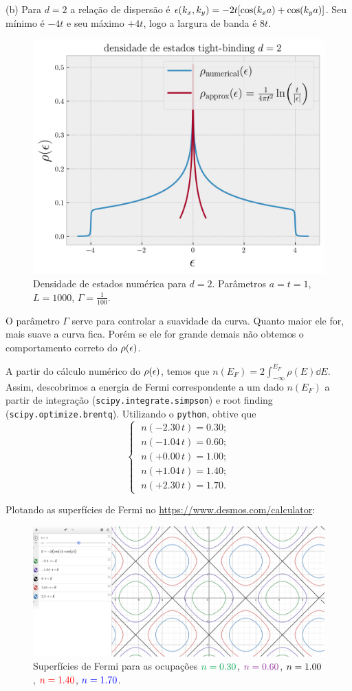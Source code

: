 \documentclass[a4paper,10pt]{article}
\begin{document}
(b) Para $d = 2$ a relação de dispersão é $\epsilon(k_x, k_y) = -2t [\cos(k_x a) + \cos(k_y a)]$. Seu mínimo é $-4t$ e seu máximo $+4t$, logo a largura de banda é $8t$.
\begin{figure}[H]
\centering
\includegraphics[width=0.7\linewidth]{fig/num_dos.png}
\caption{Densidade de estados numérica para $d = 2$. Parâmetros $a = t = 1$, $L = 1000$, $\Gamma = \frac{1}{100}$.}
\label{fig:num_dos}
\end{figure}

O parâmetro $\Gamma$ serve para controlar a suavidade da curva. Quanto maior ele for, mais suave a curva fica. Porém se ele for grande demais não obtemos o comportamento correto do $\rho(\epsilon)$.

A partir do cálculo numérico do $\rho(\epsilon)$, temos que $n(E_F) = 2 \int_{-\infty}^{E_F} \rho(E) \dd{E}$. Assim, descobrimos a energia de Fermi correspondente a um dado $n(E_F)$ a partir de integração (\texttt{scipy.integrate.simpson}) e root finding (\texttt{scipy.optimize.brentq}). Utilizando o \texttt{python}, obtive que
$$
\begin{cases}
\; n(-2.30 \, t) = 0.30; \\
\; n(-1.04 \, t) = 0.60; \\
\; n(+0.00 \, t) = 1.00; \\
\; n(+1.04 \, t) = 1.40; \\
\; n(+2.30 \, t) = 1.70.
\end{cases}
$$

Plotando as superfícies de Fermi no \url{https://www.desmos.com/calculator}:
\begin{figure}[H]
\centering
\includegraphics[width=0.8\linewidth]{fig/desmos.png}
\caption{Superfícies de Fermi para as ocupações $\textcolor{Green}{n=0.30}$, $\textcolor{Purple}{n=0.60}$, $\textcolor{black}{n=1.00}$, $\textcolor{red}{n=1.40}$, $\textcolor{blue}{n=1.70}$.}
\label{fig:desmos}
\end{figure}
\end{document}
